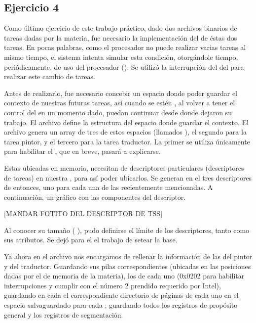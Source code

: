 \subsection{Ejercicio 4}
	Como último ejercicio de este trabajo práctico, dado dos archivos binarios de tareas dadas por la materia, fue necesario la implementación del 
 de éstas dos tareas. En pocas palabras, como el procesador no puede realizar varias tareas al mismo tiempo, el sistema intenta simular 
esta condición, otorgándole tiempo, periódicamente, de uso del procesador (). Se utilizó la interrupción del  del 
 para realizar este cambio de tareas.

	Antes de realizarlo, fue necesario concebir un espacio donde poder guardar el contexto de nuestras futuras tareas, así cuando se estén , 
al volver a tener el control del  en un momento dado, puedan continuar desde donde dejaron su trabajo. El archivo  define la 
estructura del espacio donde guardar el contexto. El archivo  genera un array de tres de estos espacios (llamados ), el segundo 
para la tarea pintor, y el tercero para la tarea traductor. La primer  se utiliza únicamente para habilitar el , que en 
breve, pasará a explicarse.

	Estas  ubicadas en memoria, necesitan de descriptores particulares (descriptores de tareas) en nuestra , para así poder 
ubicarlos. Se generan en el  tres descriptores de  entonces, uno para cada una de las recientemente mencionadas. A continuación, 
un gráfico con las componentes del descriptor. 

	[MANDAR FOTITO DEL DESCRIPTOR DE TSS]

Al conocer su tamaño ( ), pudo definirse el límite de los descriptores, tanto como sus atributos. Se dejó para el  
el trabajo de setear la base.

	Ya ahora en el archivo  nos encargamos de rellenar la información de las  del pintor y del traductor. Guardando sus 
pilas correspondientes (ubicadas en las posiciones dadas por el  de memoria de la materia), los  de cada uno (0x0202 para 
habilitar interrupciones y cumplir con el  número 2 prendido requerido por Intel), guardando en cada  el correspondiente directorio 
de páginas de cada uno en el espacio salvaguardado para cada ; guardando todos los registros de propósito general y los registros de segmentación.

